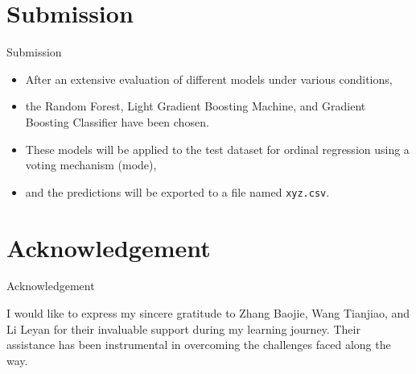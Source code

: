 \documentclass[
 size=14pt,
 paper=smartboard,  %
 mode=present, 		%
 display=slides, 	%
 style=tuliplab,  	%
 pauseslide,
 fleqn,leqno]{powerdot}
\begin{document}

\section{Submission}


\begin{slide}[toc=]{Submission}
	
	\begin{itemize}
		\item After an extensive evaluation of different models under various conditions,
		\item the Random Forest, Light Gradient Boosting Machine, and Gradient Boosting Classifier have been chosen.
		\item These models will be applied to the test dataset for ordinal regression using a voting mechanism (mode),
		\item and the predictions will be exported to a file named \texttt{xyz.csv}.
	\end{itemize}
	
\end{slide}


\section{Acknowledgement}

\begin{slide}[toc=]{Acknowledgement}
	
	I would like to express my sincere gratitude to Zhang Baojie, Wang Tianjiao, and Li Leyan for their invaluable support during my learning journey. Their assistance has been instrumental in overcoming the challenges faced along the way.
	
\end{slide}

\end{document}
